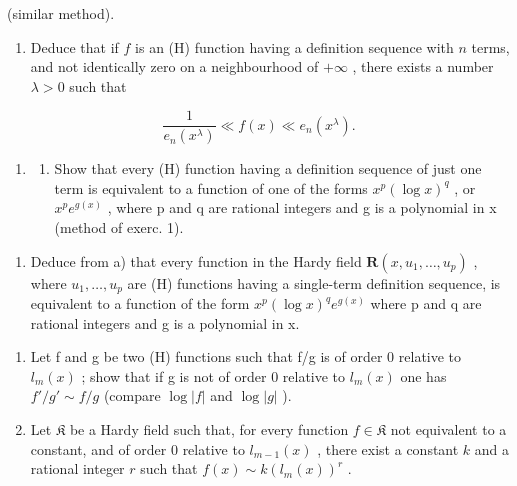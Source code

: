 (similar method).

\begin{enumerate}
\def\labelenumi{\alph{enumi})}
\setcounter{enumi}{2}
\tightlist
\item
  Deduce that if \(f\) is an (H) function having a definition sequence with \(n\) terms, and not identically zero on a neighbourhood of \(+\infty\) , there exists a number \(\lambda > 0\) such that
\end{enumerate}

\[
\frac {1}{e _ {n} (x ^ {\lambda})} \ll f (x) \ll e _ {n} (x ^ {\lambda}).
\]

\begin{enumerate}
\def\labelenumi{\arabic{enumi})}
\setcounter{enumi}{1}
\tightlist
\item
  \begin{enumerate}
  \def\labelenumii{\alph{enumii})}
  \tightlist
  \item
    Show that every (H) function having a definition sequence of just one term is equivalent to a function of one of the forms \(x^{p}(\log x)^{q}\) , or \(x^{p}e^{g(x)}\) , where p and q are rational integers and g is a polynomial in x (method of exerc. 1).
  \end{enumerate}
\end{enumerate}

\begin{enumerate}
\def\labelenumi{\alph{enumi})}
\setcounter{enumi}{1}
\tightlist
\item
  Deduce from a) that every function in the Hardy field \(\mathbf{R}(x,u_{1},\ldots,u_{p})\) , where \(u_{1},\ldots,u_{p}\) are (H) functions having a single-term definition sequence, is equivalent to a function of the form \(x^{p}(\log x)^{q}e^{g(x)}\) where p and q are rational integers and g is a polynomial in x.
\end{enumerate}

\begin{enumerate}
\def\labelenumi{\arabic{enumi})}
\setcounter{enumi}{2}
\item
  Let f and g be two (H) functions such that f/g is of order 0 relative to \(l_{m}(x)\) ; show that if g is not of order 0 relative to \(l_{m}(x)\) one has \(f'/g' \sim f/g\) (compare \(\log |f|\) and \(\log |g|\) ).
\item
  Let \(\mathfrak{K}\) be a Hardy field such that, for every function \(f\in \mathfrak{K}\) not equivalent to a constant, and of order 0 relative to \(l_{m - 1}(x)\) , there exist a constant \(k\) and a rational integer \(r\) such that \(f(x)\sim k(l_m(x))^r\) .
\end{enumerate}

